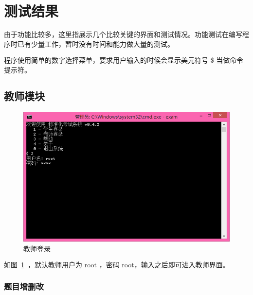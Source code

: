 \section{测试结果}

由于功能比较多，这里指展示几个比较关键的界面和测试情况。功能测试在编写程序时已有少量工作，暂时没有时间和能力做大量的测试。

程序使用简单的数字选择菜单，要求用户输入的时候会显示美元符号 \$ 当做命令提示符。

\subsection{教师模块}

\begin{figure}[htp]
\includegraphics[width=\textwidth]{image/login_teacher.png}
\caption{\label{login_teacher}教师登录}
\end{figure}

如图~\ref{login_teacher}~，默认教师用户为 root ，密码 root，输入之后即可进入教师界面。

\subsubsection{题目增删改}

